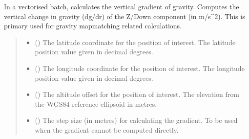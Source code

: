 \documentclass[letterpaper,10pt,english]{sphinxmanual}
\begin{document}
\begin{fulllineitems}
\begin{fulllineitems}
\label{\detokenize{modules/gravity/map:qnav.gravity.map.GravityMap.calc_vertical_grad_vec}}
\pysigstartsignatures
{}
\pysigstopsignatures
\sphinxAtStartPar
In a vectorised batch, calculates the vertical gradient of gravity.
Computes the vertical change in gravity (dg/dr) of the Z/Down
component (in m/s\textasciicircum{}2). This is primary used for gravity map\sphinxhyphen{}matching
related calculations.
\begin{quote}\begin{description}
\begin{itemize}
\item {} 
\sphinxAtStartPar
{} () \textendash{} The latitude coordinate for the position of interest.
The latitude position value given in decimal degrees.

\item {} 
\sphinxAtStartPar
{} () \textendash{} The longitude coordinate for the position of interest.
The longitude position value given in decimal degrees.

\item {} 
\sphinxAtStartPar
{} () \textendash{} The altitude offset for the position of interest.
The elevation from the WGS\sphinxhyphen{}84 reference ellipsoid in metres.

\item {} 
\sphinxAtStartPar
{} () \textendash{} The step size (in metres) for calculating the gradient.
To be used when the gradient cannot be computed directly.


\end{itemize}
\end{description}
\end{quote}
\end{fulllineitems}
\end{fulllineitems}
\end{document}
